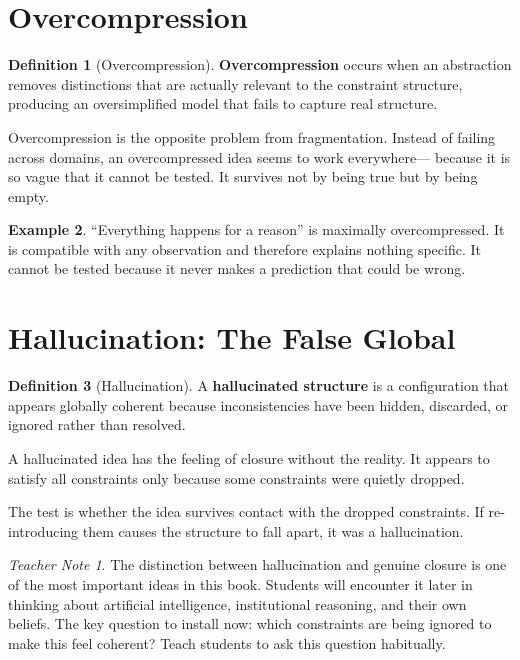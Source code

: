 \documentclass[11pt]{book}
\theoremstyle{definition}
\newtheorem{definition}{Definition}[chapter]
\newtheorem{example}[definition]{Example}
\theoremstyle{remark}
\newtheorem{teachernote}{Teacher Note}[chapter]
\begin{document}
\section{Overcompression}

\begin{definition}[Overcompression]
\textbf{Overcompression} occurs when an abstraction removes distinctions
that are actually relevant to the constraint structure, producing an
oversimplified model that fails to capture real structure.
\end{definition}

Overcompression is the opposite problem from fragmentation. Instead of
failing across domains, an overcompressed idea seems to work everywhere---
because it is so vague that it cannot be tested. It survives not by being
true but by being empty.

\begin{example}
``Everything happens for a reason'' is maximally overcompressed. It is
compatible with any observation and therefore explains nothing specific.
It cannot be tested because it never makes a prediction that could be
wrong.
\end{example}

\section{Hallucination: The False Global}

\begin{definition}[Hallucination]
A \textbf{hallucinated structure} is a configuration that appears globally
coherent because inconsistencies have been hidden, discarded, or ignored
rather than resolved.
\end{definition}

A hallucinated idea has the feeling of closure without the reality. It
appears to satisfy all constraints only because some constraints were quietly
dropped.

The test is whether the idea survives contact with the dropped constraints.
If re-introducing them causes the structure to fall apart, it was a
hallucination.

\begin{teachernote}
The distinction between hallucination and genuine closure is one of
the most important ideas in this book. Students will encounter it later
in thinking about artificial intelligence, institutional reasoning, and
their own beliefs. The key question to install now: which constraints
are being ignored to make this feel coherent? Teach students to ask
this question habitually.
\end{teachernote}
\end{document}
